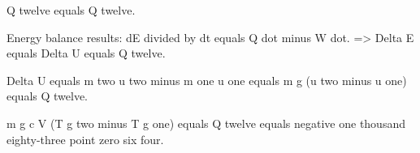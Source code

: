 Q twelve equals Q twelve.  

Energy balance results:  
dE divided by dt equals Q dot minus W dot.  
=> Delta E equals Delta U equals Q twelve.  

Delta U equals m two u two minus m one u one equals m g (u two minus u one) equals Q twelve.  

m g c V (T g two minus T g one) equals Q twelve equals negative one thousand eighty-three point zero six four.